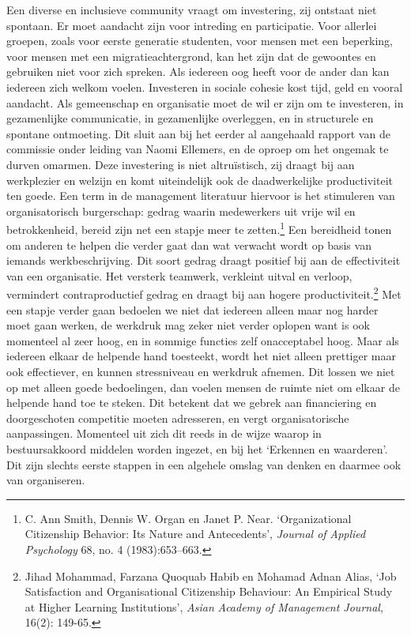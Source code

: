 \documentclass[smallauthor, chapterhaspagenum, nochapterinheader, pagenuminheader,  bigchapnum,medium2, tocpages,  garamond, titleinheader]{jote-book}
\begin{document}
	Een diverse en inclusieve community vraagt om investering, zij ontstaat niet spontaan. Er moet aandacht zijn voor intreding en participatie. Voor allerlei groepen, zoals voor eerste generatie studenten, voor mensen met een beperking, voor mensen met een migratieachtergrond, kan het zijn dat de gewoontes en gebruiken niet voor zich spreken. Als iedereen oog heeft voor de ander dan kan iedereen zich welkom voelen. Investeren in sociale cohesie kost tijd, geld en vooral aandacht. Als gemeenschap en organisatie moet de wil er zijn om te investeren, in gezamenlijke communicatie, in gezamenlijke overleggen, en in structurele en spontane ontmoeting. Dit sluit aan bij het eerder al aangehaald rapport van de commissie onder leiding van Naomi Ellemers, en de oproep om het ongemak te durven omarmen. Deze investering is niet altruïstisch, zij draagt bij aan werkplezier en welzijn en komt uiteindelijk ook de daadwerkelijke productiviteit ten goede. Een term in de management literatuur hiervoor is het stimuleren van organisatorisch burgerschap: gedrag waarin medewerkers uit vrije wil en betrokkenheid, bereid zijn net een stapje meer te zetten.\footnote{C. Ann Smith, Dennis W. Organ en Janet P. Near. ‘Organizational Citizenship Behavior: Its Nature and Antecedents', \emph{Journal of }\emph{Applied}\emph{ }\emph{Psychology} 68, no. 4 (1983):653--663.} Een bereidheid tonen om anderen te helpen die verder gaat dan wat verwacht wordt op basis van iemands werkbeschrijving. Dit soort gedrag draagt positief bij aan de effectiviteit van een organisatie. Het versterk teamwerk, verkleint uitval en verloop, vermindert contraproductief gedrag en draagt bij aan hogere productiviteit.\footnote{Jihad Mohammad, Farzana Quoquab Habib en Mohamad Adnan Alias, ‘Job Satisfaction and Organisational Citizenship Behaviour: An Empirical Study at Higher Learning Institutions', \emph{Asian}\emph{ Academy of Management Journal}, 16(2): 149-65.} Met een stapje verder gaan bedoelen we niet dat iedereen alleen maar nog harder moet gaan werken, de werkdruk mag zeker niet verder oplopen want is ook momenteel al zeer hoog, en in sommige functies zelf onacceptabel hoog. Maar als iedereen elkaar de helpende hand toesteekt, wordt het niet alleen prettiger maar ook effectiever, en kunnen stressniveau en werkdruk afnemen. Dit lossen we niet op met alleen goede bedoelingen, dan voelen mensen de ruimte niet om elkaar de helpende hand toe te steken. Dit betekent dat we gebrek aan financiering en doorgeschoten competitie moeten adresseren, en vergt organisatorische aanpassingen. Momenteel uit zich dit reeds in de wijze waarop in bestuursakkoord middelen worden ingezet, en bij het ‘Erkennen en waarderen'. Dit zijn slechts eerste stappen in een algehele omslag van denken en daarmee ook van organiseren.
\end{document}
